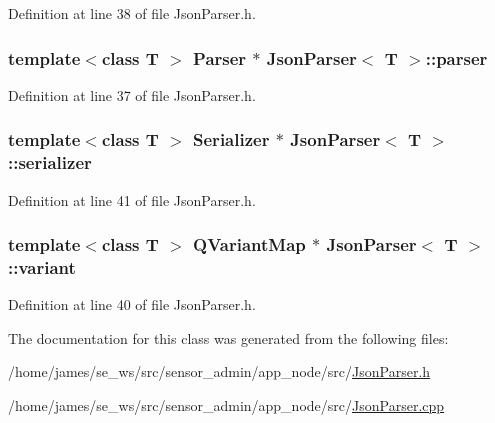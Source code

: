 Definition at line 38 of file Json\-Parser.\-h.

\hypertarget{class_json_parser_af9b00eda4e1a68574846796ada01f77e}{
\subsubsection[{parser}]{\setlength{\rightskip}{0pt plus 5cm}template$<$class T $>$ Parser $\ast$ {\bf Json\-Parser}$<$ T $>$\-::parser\hspace{0.3cm}{\ttfamily [private]}}}\label{class_json_parser_af9b00eda4e1a68574846796ada01f77e}


Definition at line 37 of file Json\-Parser.\-h.

\hypertarget{class_json_parser_afac8d34e08d9f482832564ae1bce061a}{
\subsubsection[{serializer}]{\setlength{\rightskip}{0pt plus 5cm}template$<$class T $>$ Serializer $\ast$ {\bf Json\-Parser}$<$ T $>$\-::serializer\hspace{0.3cm}{\ttfamily [private]}}}\label{class_json_parser_afac8d34e08d9f482832564ae1bce061a}


Definition at line 41 of file Json\-Parser.\-h.

\hypertarget{class_json_parser_a967feb146cd54a4edcae6a590e8377c5}{
\subsubsection[{variant}]{\setlength{\rightskip}{0pt plus 5cm}template$<$class T $>$ Q\-Variant\-Map $\ast$ {\bf Json\-Parser}$<$ T $>$\-::variant\hspace{0.3cm}{\ttfamily [private]}}}\label{class_json_parser_a967feb146cd54a4edcae6a590e8377c5}


Definition at line 40 of file Json\-Parser.\-h.



The documentation for this class was generated from the following files\-:\begin{DoxyCompactItemize}
\item 
/home/james/se\-\_\-ws/src/sensor\-\_\-admin/app\-\_\-node/src/\hyperlink{app__node_2src_2_json_parser_8h}{Json\-Parser.\-h}\item 
/home/james/se\-\_\-ws/src/sensor\-\_\-admin/app\-\_\-node/src/\hyperlink{app__node_2src_2_json_parser_8cpp}{Json\-Parser.\-cpp}\end{DoxyCompactItemize}
